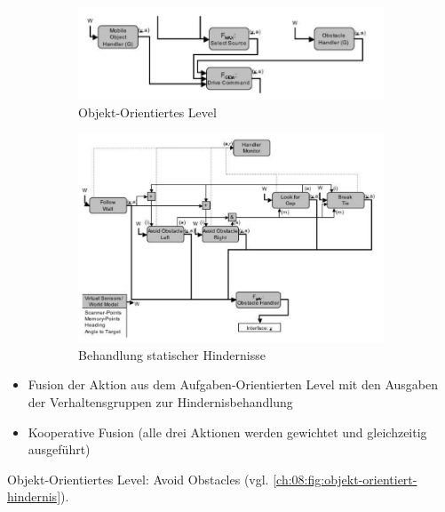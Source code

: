 \begin{figure}[h!]
	\begin{subfigure}{.5\textwidth}
		\centering
		\includegraphics[width=\textwidth]{figures/objekt_level.png}
		\caption{Objekt-Orientiertes Level}
	\end{subfigure}
	\begin{subfigure}{.5\textwidth}
		\centering
		\includegraphics[width=\textwidth]{figures/objekt_level_1.png}
		\caption{Behandlung statischer Hindernisse}
	\end{subfigure}
	\caption{}
	\label{ch:08:fig:objekt-orientiert}
\end{figure}
\begin{itemize}
	\item Fusion der Aktion aus dem Aufgaben-Orientierten Level mit den Ausgaben der Verhaltensgruppen zur Hindernisbehandlung
	\item Kooperative Fusion (alle drei Aktionen werden gewichtet und gleichzeitig ausgeführt)
\end{itemize}
Objekt-Orientiertes Level: Avoid Obstacles (vgl. \autoref{ch:08:fig:objekt-orientiert-hindernis}).

